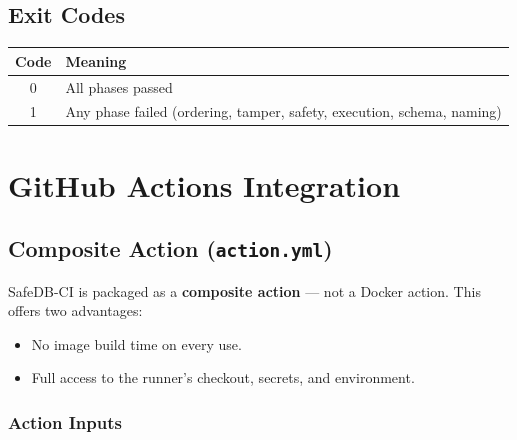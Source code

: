 \documentclass[12pt,a4paper]{report}
\begin{document}
\section{Exit Codes}

\begin{center}
\begin{tabular}{@{}cl@{}}
\toprule
\textbf{Code} & \textbf{Meaning} \\
\midrule
0 & All phases passed \\
1 & Any phase failed (ordering, tamper, safety, execution, schema, naming) \\
\bottomrule
\end{tabular}
\end{center}

\chapter{GitHub Actions Integration}

\section{Composite Action (\texttt{action.yml})}

SafeDB-CI is packaged as a \textbf{composite action} — not a Docker action.
This offers two advantages:
\begin{itemize}
  \item No image build time on every use.
  \item Full access to the runner's checkout, secrets, and environment.
\end{itemize}

\subsection{Action Inputs}
\end{document}
